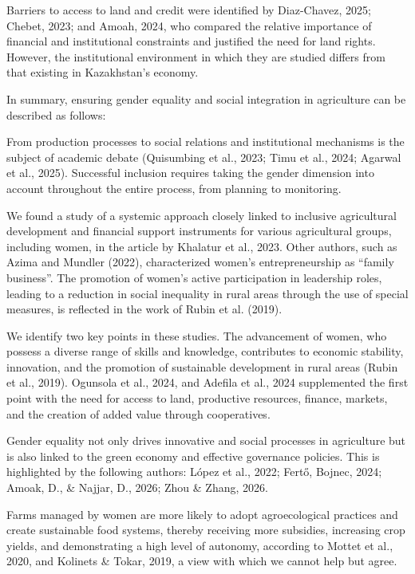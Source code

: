 \documentclass[
]{article}
\begin{document}
Barriers to access to land and credit were identified by Diaz-Chavez,
2025; Chebet, 2023; and Amoah, 2024, who compared the relative
importance of financial and institutional constraints and justified the
need for land rights. However, the institutional environment in which
they are studied differs from that existing in Kazakhstan's economy.

In summary, ensuring gender equality and social integration in
agriculture can be described as follows:

From production processes to social relations and institutional
mechanisms is the subject of academic debate (Quisumbing et al., 2023;
Timu et al., 2024; Agarwal et al., 2025). Successful inclusion requires
taking the gender dimension into account throughout the entire process,
from planning to monitoring.

We found a study of a systemic approach closely linked to inclusive
agricultural development and financial support instruments for various
agricultural groups, including women, in the article by Khalatur et al.,
2023. Other authors, such as Azima and Mundler (2022), characterized
women's entrepreneurship as ``family business''. The promotion of
women's active participation in leadership roles, leading to a reduction
in social inequality in rural areas through the use of special measures,
is reflected in the work of Rubin et al. (2019).

We identify two key points in these studies. The advancement of women,
who possess a diverse range of skills and knowledge, contributes to
economic stability, innovation, and the promotion of sustainable
development in rural areas (Rubin et al., 2019). Ogunsola et al., 2024,
and Adefila et al., 2024 supplemented the first point with the need for
access to land, productive resources, finance, markets, and the creation
of added value through cooperatives.

Gender equality not only drives innovative and social processes in
agriculture but is also linked to the green economy and effective
governance policies. This is highlighted by the following authors: López
et al., 2022; Fertő, Bojnec, 2024; Amoak, D., \& Najjar, D., 2026; Zhou
\& Zhang, 2026.

Farms managed by women are more likely to adopt agroecological practices
and create sustainable food systems, thereby receiving more subsidies,
increasing crop yields, and demonstrating a high level of autonomy,
according to Mottet et al., 2020, and Kolinets \& Tokar, 2019, a view
with which we cannot help but agree.
\end{document}

